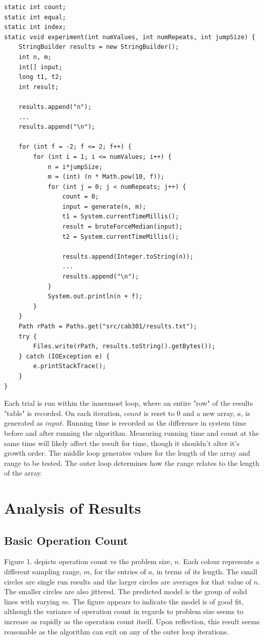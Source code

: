 \documentclass{article}
\begin{document}
\begin{lstlisting}
static int count;
static int equal;
static int index;
static void experiment(int numValues, int numRepeats, int jumpSize) {
	StringBuilder results = new StringBuilder();
	int n, m;
	int[] input;
	long t1, t2;
	int result;
	
	results.append("n");
	...
	results.append("\n");
	
	for (int f = -2; f <= 2; f++) {
		for (int i = 1; i <= numValues; i++) {
			n = i*jumpSize;
			m = (int) (n * Math.pow(10, f));
			for (int j = 0; j < numRepeats; j++) {
				count = 0;
				input = generate(n, m);
				t1 = System.currentTimeMillis();
				result = bruteForceMedian(input);
				t2 = System.currentTimeMillis();
				
				results.append(Integer.toString(n));
				...
				results.append("\n");
			}
			System.out.println(n + f);
		}
	}
	Path rPath = Paths.get("src/cab301/results.txt");
	try {
		Files.write(rPath, results.toString().getBytes());
	} catch (IOException e) {
		e.printStackTrace();
	}
}
\end{lstlisting}
Each trial is run within the innermost loop, where an entire "row" of the results "table" is recorded. On each iteration, $count$ is reset to $0$ and a new array, $a$, is generated as $input$. Running time is recorded as the difference in system time before and after running the algorithm. Measuring running time and count at the same time will likely affect the result for time, though it shouldn't alter it's growth order. The middle loop generates values for the length of the array and range to be tested. The outer loop determines how the range relates to the length of the array.



\pagebreak
\section{Analysis of Results}

\subsection{Basic Operation Count}
Figure 1. depicts operation count vs the problem size, $n$. Each colour represents a different sampling range, $m$, for the entries of $a$, in terms of its length. The small circles are single run results and the larger circles are averages for that value of $n$. The smaller circles are also jittered. The predicted model is the group of solid lines with varying $m$. The figure appears to indicate the model is of good fit, although the variance of operation count in regards to problem size seems to increase as rapidly as the operation count itself. Upon reflection, this result seems reasonable as the algorithm can exit on any of the outer loop iterations.
\end{document}
